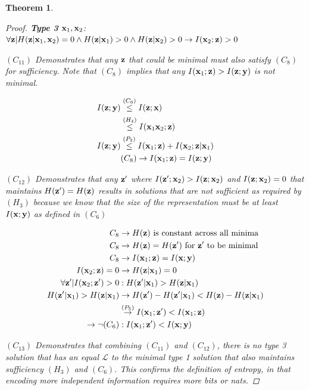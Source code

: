 \documentclass{article} %
\theoremstyle{plain}
\newtheorem{theorem}{Theorem}[section]
\theoremstyle{definition}
\theoremstyle{remark}
\begin{document}
\begin{theorem}
\begin{proof}
\textbf{Type 3} ${\mathbf{x}}_1, {\mathbf{x}}_2$: $\forall {\mathbf{z}}|H({\mathbf{z}}| {\mathbf{x}}_1 , {\mathbf{x}}_2)=0 \land H({\mathbf{z}}|{\mathbf{x}}_1)>0 \land H({\mathbf{z}}| {\mathbf{x}}_2)>0 \rightarrow I({\mathbf{x}}_2; {\mathbf{z}}) > 0$

$(C_{11})$ Demonstrates that any ${\mathbf{z}}$ that could be minimal must also satisfy $(C_8)$ for sufficiency. Note that $(C_8)$ implies that any $I({\mathbf{x}}_1; {\mathbf{z}}) >  I({\mathbf{z}};{\mathbf{y}})$ is not minimal.

$$
\begin{aligned}
    I({\mathbf{z}}; {\mathbf{y}})&\stackrel{\left(C_6\right)}{\leq} I({\mathbf{z}}; {\mathbf{x}})  \\
    &\stackrel{\left(H_4\right)}{\leq}  I({\mathbf{x}}_1 {\mathbf{x}}_2; {\mathbf{z}}) \\
    I({\mathbf{z}}; {\mathbf{y}}) &\stackrel{\left(P_2\right)}{\leq} I({\mathbf{x}}_1; {\mathbf{z}}) + I({\mathbf{x}}_2; {\mathbf{z}}| {\mathbf{x}}_1) \\
    & (C_8) \rightarrow I({\mathbf{x}}_1; {\mathbf{z}}) =  I({\mathbf{z}}; {\mathbf{y}}) \\
\end{aligned}
$$

$(C_{12})$ Demonstrates that any ${\mathbf{z}}'$ where $I({\mathbf{z}}'; {\mathbf{x}}_2)>I({\mathbf{z}}; {\mathbf{x}}_2)$ and $I({\mathbf{z}}; {\mathbf{x}}_2) = 0$ that maintains $H({\mathbf{z}}') = H({\mathbf{z}})$ results in  solutions that are not sufficient as required by $(H_3)$ because we know that the size of the representation must be at least $I({\mathbf{x}}; {\mathbf{y}})$ as defined in $(C_6)$

$$
\begin{aligned}
    C_8 &\rightarrow  H({\mathbf{z}}) \text{ is constant across all minima}\\
    C_8 &\rightarrow  H({\mathbf{z}}) = H({\mathbf{z}}')\text{ for } {\mathbf{z}}' \text{ to be minimal}\\
    C_8 &\rightarrow  I({\mathbf{x}}_1; {\mathbf{z}}) = I({\mathbf{x}}; {\mathbf{y}})\\
    I({\mathbf{x}}_2; {\mathbf{z}}) = 0 &\rightarrow H({\mathbf{z}}| {\mathbf{x}}_1) = 0 \\
    \forall {\mathbf{z}}'|I({\mathbf{x}}_2; {\mathbf{z}}') > 0  &:  H({\mathbf{z}}'| {\mathbf{x}}_1) > H({\mathbf{z}}| {\mathbf{x}}_1) \\
   H({\mathbf{z}}'| {\mathbf{x}}_1) > H({\mathbf{z}}| {\mathbf{x}}_1)   &\rightarrow H({\mathbf{z}}') - H({\mathbf{z}}'| {\mathbf{x}}_1) < H({\mathbf{z}}) - H({\mathbf{z}}| {\mathbf{x}}_1)  \\
    &\stackrel{\left(P_5\right)}{\rightarrow}  I({\mathbf{x}}_1; {\mathbf{z}}') < I({\mathbf{x}}_1; {\mathbf{z}})  \\
    \rightarrow \neg (C_6) &:  I({\mathbf{x}}_1; {\mathbf{z}}') < I({\mathbf{x}}; {\mathbf{y}}) 
\end{aligned}
$$

$(C_{13})$ Demonstrates that combining $(C_{11})$ and $(C_{12})$, there is no type 3 solution that has an equal $\mathcal{L}$ to the minimal type 1 solution that also maintains sufficiency $(H_3)$ and $(C_6)$. This confirms the definition of entropy, in that encoding more independent information requires more bits or nats. 


\end{proof}
\end{theorem}
\end{document}
